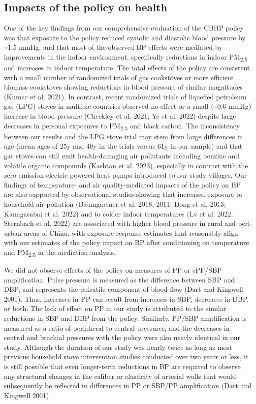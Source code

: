 \documentclass[
  letterpaper,
  DIV=11,
  numbers=noendperiod]{scrartcl}
\begin{document}
\hypertarget{impacts-of-the-policy-on-health}{%
\subsection{Impacts of the policy on
health}\label{impacts-of-the-policy-on-health}}

One of the key findings from our comprehensive evaluation of the CBHP
policy was that exposure to the policy reduced systolic and diastolic
blood pressure by \textasciitilde1.5 mmHg, and that most of the observed
BP effects were mediated by improvements in the indoor environment,
specifically reductions in indoor PM\textsubscript{2.5} and increases in
indoor temperature. The total effects of the policy are consistent with
a small number of randomized trials of gas cookstoves or more efficient
biomass cookstoves showing reductions in blood pressure of similar
magnitudes (Kumar et al. 2021). In contrast, recent randomized trials of
liquefied petroleum gas (LPG) stoves in multiple countries observed no
effect or a small (\textasciitilde0.6 mmHg) increase in blood pressure
(Checkley et al. 2021; Ye et al. 2022) despite large decreases in
personal exposures to PM\textsubscript{2.5} and black carbon. The
inconsistency between our results and the LPG stove trial may stem from
large differences in age (mean ages of 25y and 48y in the trials versus
61y in our sample) and that gas stoves can still emit health-damaging
air pollutants including benzine and volatile organic compounds (Kashtan
et al. 2023), especially in contrast with the zero-emission
electric-powered heat pumps introduced to our study villages. Our
findings of temperature- and air quality-mediated impacts of the policy
on BP are also supported by observational studies showing that increased
exposure to household air pollution (Baumgartner et al. 2018, 2011; Dong
et al. 2013; Kanagasabai et al. 2022) and to colder indoor temperatures
(Lv et al. 2022; Sternbach et al. 2022) are associated with higher blood
pressure in rural and peri-urban areas of China, with exposure-response
estimates that reasonably align with our estimates of the policy impact
on BP after conditioning on temperature and PM\textsubscript{2.5} in the
mediation analysis.

We did not observe effects of the policy on measures of PP or cPP/SBP
amplification. Pulse pressure is measured as the difference between SBP
and DBP, and represents the pulsatile component of blood flow (Dart and
Kingwell 2001). Thus, increases in PP can result from increases in SBP,
decreases in DBP, or both. The lack of effect on PP in our study is
attributed to the similar reductions in SBP and DBP from the policy.
Similarly, PP/SBP amplification is measured as a ratio of peripheral to
central pressures, and the decreases in central and brachial pressures
with the policy were also nearly identical in our study. Although the
duration of our study was nearly twice as long as most previous
household stove intervention studies conducted over two years or less,
it is still possible that even longer-term reductions in BP are required
to observe any structural changes in the caliber or elasticity of
arterial walls that would subsequently be reflected in differences in PP
or SBP/PP amplification (Dart and Kingwell 2001).
\end{document}
